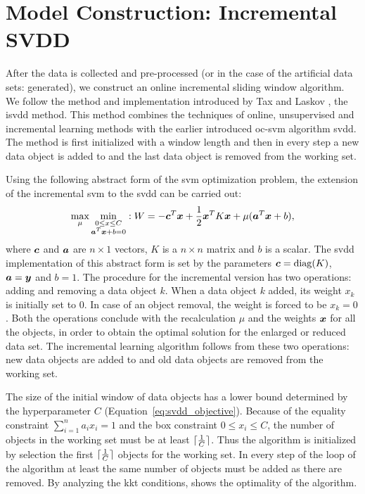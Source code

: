 \section{Model Construction: Incremental SVDD}\label{sec:method_model_construction}
After the data is collected and pre-processed (or in the case of the artificial data sets: generated), we construct an online incremental sliding window algorithm.
We follow the method and implementation introduced by Tax and Laskov \cite{tax2003online}, the \acrlong{isvdd} method.
This method combines the techniques of online, unsupervised and incremental learning methods with the earlier introduced \gls{oc-svm} algorithm \gls{svdd}.
The method is first initialized with a window length and then in every step a new data object is added to and the last data object is removed from the working set.

Using the following abstract form of the \gls{svm} optimization problem, the extension of the incremental \gls{svm} to the \gls{svdd} can be carried out:
\begin{equation}
  \operatorname*{max}_\mu \operatorname*{min}_{\substack{
    0 \le x \le C \\
    \vectorsym{a}^T \vectorsym{x} + b = 0}
  } : W = -\vectorsym{c}^T\vectorsym{x} + \frac{1}{2}\vectorsym{x}^T K\vectorsym{x} + \mu(\vectorsym{a}^T\vectorsym{x} + b),
\end{equation}
where $\vectorsym{c}$ and $\vectorsym{a}$ are $n \times 1$ vectors, $K$ is a $n \times n$ matrix and $b$ is a scalar.
The \gls{svdd} implementation of this abstract form is set by the parameters $\vectorsym{c}=\operatorname*{diag}(K)$, $\vectorsym{a} = \vectorsym{y}$ and $b=1$.
The procedure for the incremental version has two operations: adding and removing a data object $k$.
When a data object $k$ added, its weight $x_k$ is initially set to $0$.
In case of an object removal, the weight is forced to be $x_k=0$.
Both the operations conclude with the recalculation $\mu$ and the weights $\vectorsym{x}$ for all the objects, in order to obtain the optimal solution for the enlarged or reduced data set.
The incremental learning algorithm follows from these two operations: new data objects are added to and old data objects are removed from the working set.

The size of the initial window of data objects has a lower bound determined by the hyperparameter $C$ (Equation~\ref{eq:svdd_objective}).
Because of the equality constraint $\sum_{i=1}^n a_i x_i = 1$ and the box constraint $0 \le x_i \le C$, the number of objects in the working set must be at least $\lceil\frac{1}{C}\rceil$.
Thus the algorithm is initialized by selection the first $\lceil\frac{1}{C}\rceil$ objects for the working set.
In every step of the loop of the algorithm at least the same number of objects must be added as there are removed.
By analyzing the \gls{kkt} conditions, \cite{tax2003online} shows the optimality of the algorithm.

